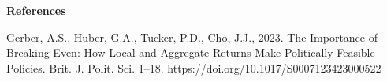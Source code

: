 \documentclass[12pt,letterpaper]{article}
\begin{document}
\hspace{5cm}
\newpage
\textbf{References}

Gerber, A.S., Huber, G.A., Tucker, P.D., Cho, J.J., 2023. The Importance of Breaking Even: How Local and Aggregate Returns Make Politically Feasible Policies. Brit. J. Polit. Sci. 1–18. https://doi.org/10.1017/S0007123423000522
\end{document}
